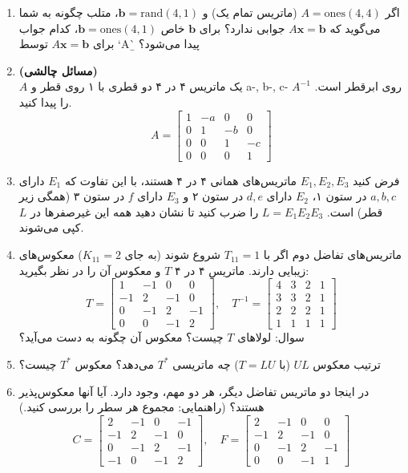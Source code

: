 \documentclass[12pt, a4paper]{book}
\begin{document}
\begin{enumerate}
		\item اگر $A=\text{ones}(4,4)$ (ماتریس تمام یک) و $\mathbf{b}=\text{rand}(4,1)$، متلب چگونه به شما می‌گوید که $A\mathbf{x}=\mathbf{b}$ جوابی ندارد؟ برای $\mathbf{b}$ خاص $\mathbf{b}=\text{ones}(4,1)$، کدام جواب برای $A\mathbf{x}=\mathbf{b}$ توسط `A\b` پیدا می‌شود؟
		
		\item \textbf{(مسائل چالشی)}\\
		$A$ یک ماتریس ۴ در ۴ دو قطری با ۱ روی قطر و a-, b-, c- روی ابرقطر است. $A^{-1}$ را پیدا کنید.
		\[ A = \begin{bmatrix} 1 & -a & 0 & 0 \\ 0 & 1 & -b & 0 \\ 0 & 0 & 1 & -c \\ 0 & 0 & 0 & 1 \end{bmatrix} \]
		
		\item فرض کنید $E_1, E_2, E_3$ ماتریس‌های همانی ۴ در ۴ هستند، با این تفاوت که $E_1$ دارای $a,b,c$ در ستون ۱، $E_2$ دارای $d,e$ در ستون ۲ و $E_3$ دارای $f$ در ستون ۳ (همگی زیر قطر) است. $L=E_1E_2E_3$ را ضرب کنید تا نشان دهید همه این غیرصفرها در $L$ کپی می‌شوند.
		
		\item ماتریس‌های تفاضل دوم اگر با $T_{11}=1$ شروع شوند (به جای $K_{11}=2$) معکوس‌های زیبایی دارند. ماتریس ۴ در ۴ $T$ و معکوس آن را در نظر بگیرید:
		\[ T = \begin{bmatrix} 1 & -1 & 0 & 0 \\ -1 & 2 & -1 & 0 \\ 0 & -1 & 2 & -1 \\ 0 & 0 & -1 & 2 \end{bmatrix}, \quad T^{-1} = \begin{bmatrix} 4 & 3 & 2 & 1 \\ 3 & 3 & 2 & 1 \\ 2 & 2 & 2 & 1 \\ 1 & 1 & 1 & 1 \end{bmatrix} \]
		سوال: لولاهای $T$ چیست؟ معکوس آن چگونه به دست می‌آید؟
		
		\item ترتیب معکوس $UL$ (با $T=LU$) چه ماتریسی $T^*$ می‌دهد؟ معکوس $T^*$ چیست؟
		
		\item در اینجا دو ماتریس تفاضل دیگر، هر دو مهم، وجود دارد. آیا آنها معکوس‌پذیر هستند؟ (راهنمایی: مجموع هر سطر را بررسی کنید.)
		\[ C = \begin{bmatrix} 2 & -1 & 0 & -1 \\ -1 & 2 & -1 & 0 \\ 0 & -1 & 2 & -1 \\ -1 & 0 & -1 & 2 \end{bmatrix}, \quad F = \begin{bmatrix} 2 & -1 & 0 & 0 \\ -1 & 2 & -1 & 0 \\ 0 & -1 & 2 & -1 \\ 0 & 0 & -1 & 1 \end{bmatrix} \]
		

\end{enumerate}
\end{document}
